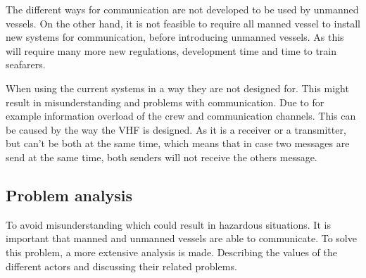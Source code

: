 The different ways for communication are not developed to be used by unmanned vessels. On the other hand, it is not feasible to require all manned vessel to install new systems for communication, before introducing unmanned vessels. As this will require many more new regulations, development time and time to train seafarers.

When using the current systems in a way they are not designed for. This might result in misunderstanding and problems with communication. Due to for example information overload of the crew and communication channels. This can be caused by the way the \ac{VHF} is designed. As it is a receiver or a transmitter, but can't be both at the same time, which means that in case two messages are send at the same time, both senders will not receive the others message.

\subsection{Problem analysis}
To avoid misunderstanding which could result in hazardous situations. It is important that manned and unmanned vessels are able to communicate. To solve this problem, a more extensive analysis is made. 
Describing the values of the different actors and discussing their related problems.

